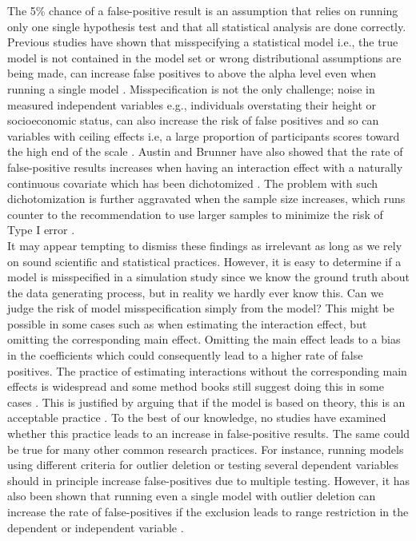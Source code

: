 The 5\% chance of a false-positive result is an assumption that relies on running only one single hypothesis test and that all statistical analysis are done correctly. Previous studies have shown that misspecifying a statistical model i.e., the true model is not contained in the model set or wrong distributional assumptions are being made, can increase false positives to above the alpha level even when running a single model \citep{Dennis2019,Litiere2007}. Misspecification is not the only challenge; noise in measured independent variables e.g., individuals overstating their height or socioeconomic status, can also increase the risk of false positives \citep{Brunner2009} and so can variables with ceiling effects i.e, a large proportion of participants scores toward the high end of the scale \citep{Austin2003}. Austin and Brunner have also showed that the rate of false-positive results increases when having an interaction effect with a naturally continuous covariate which has been dichotomized \citep{Austin2004}. The problem with such dichotomization is further aggravated when the sample size increases, which runs counter to the recommendation to use larger samples to minimize the risk of Type I error \citep{simmons2018}. 
\\
It may appear tempting to dismiss these findings as irrelevant as long as we rely on sound scientific and statistical practices. However, it is easy to determine if a model is misspecified in a simulation study since we know the ground truth about the data generating process, but in reality we hardly ever know this. Can we judge the risk of model misspecification simply from the model? This might be possible in some cases such as when estimating the interaction effect, but omitting the corresponding main effect. Omitting the main effect leads to a bias in the coefficients \citep{Branbor2006} which could consequently lead to a higher rate of false positives. The practice of estimating interactions without the corresponding main effects is widespread \citep{Branbor2006} and some method books still suggest doing this in some cases \citep{Cleves2008}. This is justified by arguing that if the model is based on theory, this is an acceptable practice \citep{aiken1991multiple}. To the best of our knowledge, no studies have examined whether this practice leads to an increase in false-positive results. The same could be true for many other common research practices. For instance, running models using different criteria for outlier deletion or testing several dependent variables should in principle increase false-positives due to multiple testing. However, it has also been shown that running even a single model with outlier deletion can increase the rate of false-positives if the exclusion leads to range restriction in the dependent or independent variable \citep{Raju2003}. \\        

